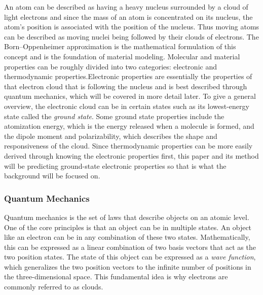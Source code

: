 \documentclass[12pt]{scrartcl}
\begin{document}
An atom can be described as having a heavy nucleus surrounded by a cloud of light 
electrons and since the mass of an atom is concentrated on its nucleus, the atom's 
position is associated with the position of the nucleus. Thus moving atoms can be described
as moving nuclei being followed by their clouds of electrons. The Born–Oppenheimer 
approximation is the mathematical formulation of this concept and is the foundation 
of material modeling. Molecular and material properties can be roughly divided into 
two categories: electronic and thermodynamic properties.Electronic properties are 
essentially the properties of that electron cloud that is following the nucleus and 
is best described through quantum mechanics, which will be covered in more detail later. 
To give a general overview, the electronic cloud can be in certain states such as its 
lowest-energy state called the \emph{ground state}. Some ground state properties include the
atomization energy, which is the energy released when a molecule is formed, and the 
dipole moment and polarizability, which describes the shape and responsiveness of the
cloud. Since thermodynamic properties can be more easily derived through knowing the electronic 
properties first, this paper and its method will be predicting ground-state electronic properties 
so that is what the background will be focused on. 


\subsubsection{Quantum Mechanics}
Quantum mechanics is the set of laws that describe objects on an atomic level. One of the core
principles is that an object can be in multiple states. An object like an electron can be in any 
combination of these two states. Mathematically, this can be expressed as a linear combination of 
two basis vectors that act as the two position states. The state of this object can be expressed 
as a \emph{wave function}, which generalizes the two position vectors to the infinite number of 
positions in the three-dimensional space. This fundamental idea is why electrons are commonly 
referred to as clouds.
\end{document}
